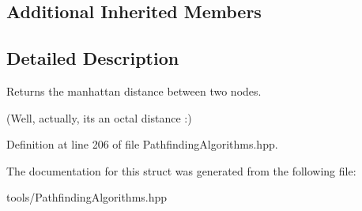 \subsection*{Additional Inherited Members}


\subsection{Detailed Description}
Returns the manhattan distance between two nodes. 

(Well, actually, it\textquotesingle{}s an octal distance \+:) 

Definition at line 206 of file Pathfinding\+Algorithms.\+hpp.



The documentation for this struct was generated from the following file\+:\begin{DoxyCompactItemize}
\item 
tools/Pathfinding\+Algorithms.\+hpp\end{DoxyCompactItemize}
